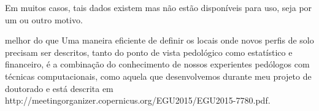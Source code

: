 Em muitos casos, tais dados 
existem mas não estão disponíveis para uso, seja por um ou outro motivo. 


 melhor do que  Uma maneira eficiente de definir os locais onde novos perfis de solo precisam ser descritos, tanto do ponto de vista pedológico como estatístico e financeiro, é a combinação do conhecimento de nossos experientes pedólogos com técnicas computacionais, como aquela que desenvolvemos durante meu projeto de doutorado e está descrita em http://meetingorganizer.copernicus.org/EGU2015/EGU2015-7780.pdf.
